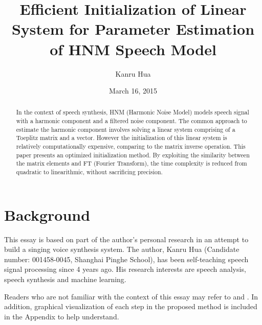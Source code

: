 \documentclass[dvips]{article}
\begin{document}
\title{Efficient Initialization of Linear System for Parameter Estimation of HNM Speech Model}

\author{Kanru Hua}
\date{March 16, 2015}
 
%
%
%
 
\maketitle %
 
\begin{abstract}
In the context of speech synthesis, HNM (Harmonic Noise Model) models speech signal with a harmonic component and a filtered noise component. The common approach to estimate the harmonic component involves solving a linear system comprising of a Toeplitz matrix and a vector. However the initialization of this linear system is relatively computationally expensive, comparing to the matrix inverse operation. This paper presents an optimized initialization method. By exploiting the similarity between the matrix elements and FT (Fourier Transform), the time complexity is reduced from quadratic to linearithmic, without sacrificing precision.
\end{abstract}

\section*{Background}

This essay is based on part of the author's personal research in an attempt to build a singing voice synthesis system. The author, Kanru Hua (Candidate number: 001458-0045, Shanghai Pinghe School), has been self-teaching speech signal processing since 4 years ago. His research interests are speech analysis, speech synthesis and machine learning.

Readers who are not familiar with the context of this essay may refer to \cite{stylianou-1996} and \cite{smith}. In addition, graphical visualization of each step in the proposed method is included in the Appendix to help understand.
\end{document}
